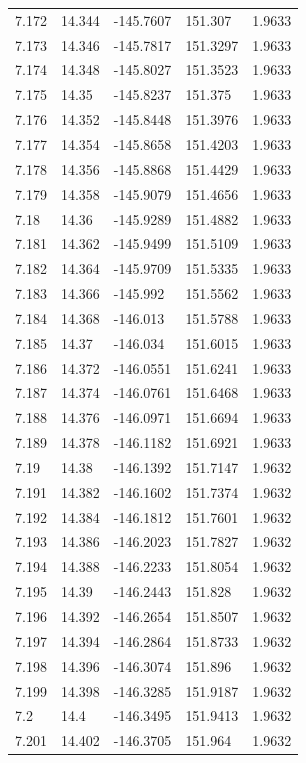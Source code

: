 \begin{tabular}{lllll}
7.172 & 14.344 & -145.7607 & 151.307 & 1.9633 \\
7.173 & 14.346 & -145.7817 & 151.3297 & 1.9633 \\
7.174 & 14.348 & -145.8027 & 151.3523 & 1.9633 \\
7.175 & 14.35 & -145.8237 & 151.375 & 1.9633 \\
7.176 & 14.352 & -145.8448 & 151.3976 & 1.9633 \\
7.177 & 14.354 & -145.8658 & 151.4203 & 1.9633 \\
7.178 & 14.356 & -145.8868 & 151.4429 & 1.9633 \\
7.179 & 14.358 & -145.9079 & 151.4656 & 1.9633 \\
7.18 & 14.36 & -145.9289 & 151.4882 & 1.9633 \\
7.181 & 14.362 & -145.9499 & 151.5109 & 1.9633 \\
7.182 & 14.364 & -145.9709 & 151.5335 & 1.9633 \\
7.183 & 14.366 & -145.992 & 151.5562 & 1.9633 \\
7.184 & 14.368 & -146.013 & 151.5788 & 1.9633 \\
7.185 & 14.37 & -146.034 & 151.6015 & 1.9633 \\
7.186 & 14.372 & -146.0551 & 151.6241 & 1.9633 \\
7.187 & 14.374 & -146.0761 & 151.6468 & 1.9633 \\
7.188 & 14.376 & -146.0971 & 151.6694 & 1.9633 \\
7.189 & 14.378 & -146.1182 & 151.6921 & 1.9633 \\
7.19 & 14.38 & -146.1392 & 151.7147 & 1.9632 \\
7.191 & 14.382 & -146.1602 & 151.7374 & 1.9632 \\
7.192 & 14.384 & -146.1812 & 151.7601 & 1.9632 \\
7.193 & 14.386 & -146.2023 & 151.7827 & 1.9632 \\
7.194 & 14.388 & -146.2233 & 151.8054 & 1.9632 \\
7.195 & 14.39 & -146.2443 & 151.828 & 1.9632 \\
7.196 & 14.392 & -146.2654 & 151.8507 & 1.9632 \\
7.197 & 14.394 & -146.2864 & 151.8733 & 1.9632 \\
7.198 & 14.396 & -146.3074 & 151.896 & 1.9632 \\
7.199 & 14.398 & -146.3285 & 151.9187 & 1.9632 \\
7.2 & 14.4 & -146.3495 & 151.9413 & 1.9632 \\
7.201 & 14.402 & -146.3705 & 151.964 & 1.9632 \\

\end{tabular}
